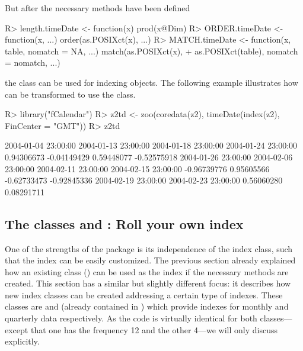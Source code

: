 \documentclass{Z}
\begin{document}
But after the necessary methods have been defined
\begin{Schunk}
\begin{Sinput}
R> length.timeDate <- function(x) prod(x@Dim)
R> ORDER.timeDate <- function(x, ...) order(as.POSIXct(x), ...)
R> MATCH.timeDate <- function(x, table, nomatch = NA, ...) match(as.POSIXct(x), 
+     as.POSIXct(table), nomatch = nomatch, ...)
\end{Sinput}
\end{Schunk}
the class  can be used for indexing  objects.
The following example illustrates how  can be transformed
to use the  class.
\begin{Schunk}
\begin{Sinput}
R> library("fCalendar")
R> z2td <- zoo(coredata(z2), timeDate(index(z2), FinCenter = "GMT"))
R> z2td
\end{Sinput}
\begin{Soutput}
2004-01-04 23:00:00 2004-01-13 23:00:00 2004-01-18 23:00:00 2004-01-24 23:00:00 
         0.94306673         -0.04149429          0.59448077         -0.52575918 
2004-01-26 23:00:00 2004-02-06 23:00:00 2004-02-11 23:00:00 2004-02-15 23:00:00 
        -0.96739776          0.95605566         -0.62733473         -0.92845336 
2004-02-19 23:00:00 2004-02-23 23:00:00 
         0.56060280          0.08291711 
\end{Soutput}
\end{Schunk}

\subsection[The classes "yearmon" and "yearqtr": Roll your own index]{The classes  and : Roll your own index}
\label{sec:yearmon}

One of the strengths of the  package is its independence of the
index class, such that the index can be easily customized. The previous section
already explained how an existing class () can be used as
the index if the necessary methods are created. This section has a similar
but slightly different focus: it describes how new index classes can be created
addressing a certain type of indexes. These classes are  and
 (already contained in ) which provide indexes for
monthly and quarterly data respectively.
As the code is virtually identical for both classes---except that one has the 
frequency 12 and the other 4---we will only discuss  explicitly.
\end{document}
